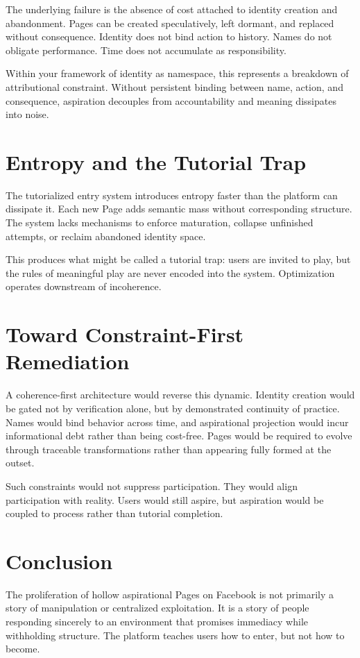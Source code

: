 \documentclass[11pt,oneside]{article}
\begin{document}
The underlying failure is the absence of cost attached to identity creation and abandonment. Pages can be created speculatively, left dormant, and replaced without consequence. Identity does not bind action to history. Names do not obligate performance. Time does not accumulate as responsibility.

Within your framework of identity as namespace, this represents a breakdown of attributional constraint. Without persistent binding between name, action, and consequence, aspiration decouples from accountability and meaning dissipates into noise.

\section{Entropy and the Tutorial Trap}

The tutorialized entry system introduces entropy faster than the platform can dissipate it. Each new Page adds semantic mass without corresponding structure. The system lacks mechanisms to enforce maturation, collapse unfinished attempts, or reclaim abandoned identity space.

This produces what might be called a tutorial trap: users are invited to play, but the rules of meaningful play are never encoded into the system. Optimization operates downstream of incoherence.

\section{Toward Constraint-First Remediation}

A coherence-first architecture would reverse this dynamic. Identity creation would be gated not by verification alone, but by demonstrated continuity of practice. Names would bind behavior across time, and aspirational projection would incur informational debt rather than being cost-free. Pages would be required to evolve through traceable transformations rather than appearing fully formed at the outset.

Such constraints would not suppress participation. They would align participation with reality. Users would still aspire, but aspiration would be coupled to process rather than tutorial completion.

\section{Conclusion}

The proliferation of hollow aspirational Pages on Facebook is not primarily a story of manipulation or centralized exploitation. It is a story of people responding sincerely to an environment that promises immediacy while withholding structure. The platform teaches users how to enter, but not how to become.
\end{document}
